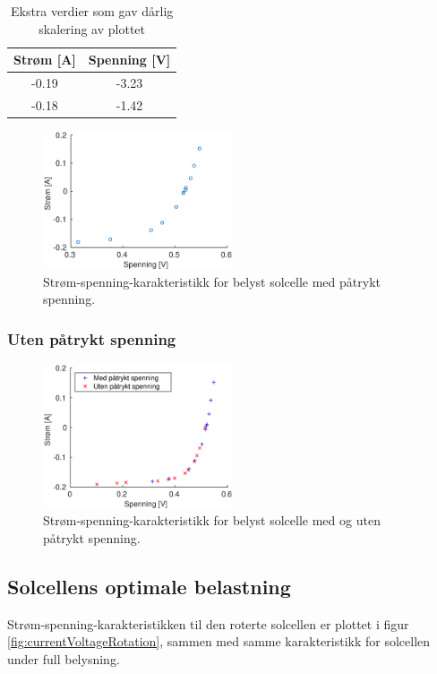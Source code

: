 \documentclass[a4paper,11pt, twocolumn]{article}
\begin{document}
\begin{table}[!ht]
\centering
	\begin{tabular}{cc}
		\toprule
		\toprule
		Strøm [A] & Spenning [V]\\
		\hline
		-0.19 & -3.23\\
		-0.18 & -1.42\\
		\toprule
	\end{tabular}
	\caption{Ekstra verdier som gav dårlig skalering av plottet}
	\label{tab:ekstra}
\end{table}

\begin{figure}[!ht]
	\includegraphics[width = 0.5\textwidth]{matlab/LAB/belystMedSpenning.eps}
	\caption{Strøm-spenning-karakteristikk for belyst solcelle med påtrykt spenning.}
	\label{fig:resMedSpenning}
\end{figure}

\subsubsection{Uten påtrykt spenning}
\begin{figure}[!ht]
	\includegraphics[width = 0.5\textwidth]{matlab/LAB/utenSpenning.eps}
	\caption{Strøm-spenning-karakteristikk for belyst solcelle med og uten påtrykt spenning.}
	\label{fig:resUtenSpenning}
\end{figure}

\subsection{Solcellens optimale belastning}
Strøm-spenning-karakteristikken til den roterte solcellen er plottet i figur \ref{fig:currentVoltageRotation}, sammen med samme karakteristikk for solcellen under full belysning.
\end{document}
